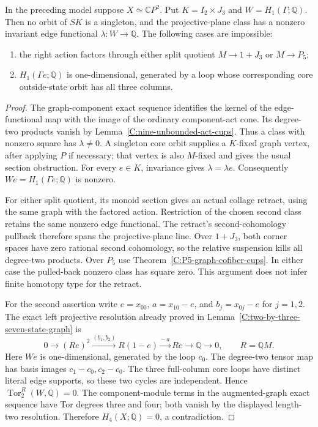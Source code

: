 \begin{lemma}
\label{C:two-by-three-eight-state-reductions}
In the preceding model suppose $X\simeq\mathbb CP^2$.
Put $K=I_2\times J_3$ and $W=H_1(\Gamma;\mathbb Q)$.
Then no orbit of $SK$ is a singleton, and the projective-plane
class has a nonzero invariant edge functional
$\lambda:W\to\mathbb Q$.  The following cases are impossible:
\begin{enumerate}
\item the right action factors through either split quotient
$M\to1+J_3$ or $M\to P_5$;
\item $H_1(\Gamma e;\mathbb Q)$ is one-dimensional, generated by
a loop whose corresponding core outside-state orbit has all three
columns.
\end{enumerate}
\end{lemma}
\begin{proof}
The graph-component exact sequence identifies the kernel of
the edge-functional map with the image of the ordinary
component-act cone.  Its degree-two products vanish by
Lemma~\ref{C:nine-unbounded-act-cups}.  Thus a class with nonzero
square has $\lambda\ne0$.  A singleton core orbit supplies a
$K$-fixed graph vertex, after applying $P$ if necessary; that
vertex is also $M$-fixed and gives the usual section obstruction.
For every $e\in K$, invariance gives $\lambda=\lambda e$.
Consequently $We=H_1(\Gamma e;\mathbb Q)$ is nonzero.

For either split quotient, its monoid section gives an actual
collage retract, using the same graph with the factored action.
Restriction of the chosen second class retains the same nonzero
edge functional.  The retract's second-cohomology pullback
therefore spans the projective-plane line.  Over $1+J_3$, both
corner spaces have zero rational second cohomology, so the
relative suspension kills all degree-two products.  Over $P_5$
use Theorem~\ref{C:P5-graph-cofiber-cups}.  In either case
the pulled-back nonzero class has square zero.  This argument
does not infer finite homotopy type for the retract.

For the second assertion write $e=x_{00}$,
$a=x_{10}-e$, and $b_j=x_{0j}-e$ for $j=1,2$.
The exact left projective resolution already proved in
Lemma~\ref{C:two-by-three-seven-state-graph} is
\[
0\longrightarrow (Re)^2\xrightarrow{(b_1,b_2)}R(1-e)
 \xrightarrow{{-}\,a}Re\longrightarrow\mathbb Q
 \longrightarrow0,\qquad R=\mathbb QM.
\]
Here $We$ is one-dimensional, generated by the loop $c_0$.
The degree-two tensor map has basis images
$c_1-c_0,c_2-c_0$.  The three full-column core loops have
distinct literal edge supports, so these two cycles are
independent.  Hence $\operatorname{Tor}_2^R(W,\mathbb Q)=0$.
The component-module terms in the augmented-graph exact
sequence have Tor degrees three and four; both vanish by
the displayed length-two resolution.  Therefore
$H_4(X;\mathbb Q)=0$, a contradiction.
\end{proof}

